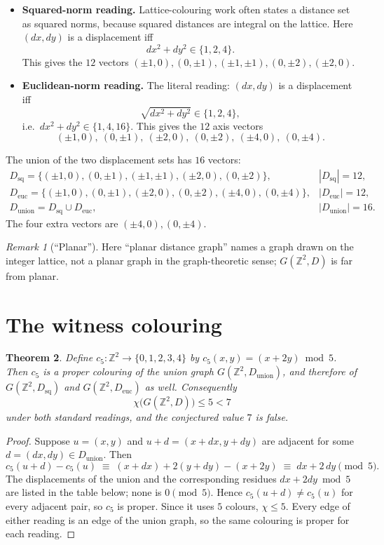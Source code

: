 \documentclass[11pt]{article}
\newtheorem{theorem}{Theorem}
\theoremstyle{definition}
\theoremstyle{remark}
\newtheorem{remark}[theorem]{Remark}
\newcommand{\Z}{\mathbb{Z}}
\newcommand{\chiG}{\chi}
\begin{document}
\begin{itemize}
\item \textbf{Squared-norm reading.} Lattice-colouring work often states a
  distance set as squared norms, because squared distances are integral on the
  lattice. Here $(dx,dy)$ is a displacement iff
  \[
    dx^2 + dy^2 \in \{1,2,4\}.
  \]
  This gives the $12$ vectors $(\pm1,0),(0,\pm1),(\pm1,\pm1),(0,\pm2),(\pm2,0)$.
\item \textbf{Euclidean-norm reading.} The literal reading: $(dx,dy)$ is a
  displacement iff
  \[
    \sqrt{dx^2+dy^2} \in \{1,2,4\},
  \]
  i.e.\ $dx^2+dy^2 \in \{1,4,16\}$. This gives the $12$ axis vectors
  \[
    (\pm1,0),\ (0,\pm1),\ (\pm2,0),\ (0,\pm2),\ (\pm4,0),\ (0,\pm4).
  \]
\end{itemize}

The union of the two displacement sets has $16$ vectors:
\[
\begin{array}{ll}
D_{\mathrm{sq}} = \{(\pm1,0),(0,\pm1),(\pm1,\pm1),(\pm2,0),(0,\pm2)\}, & |D_{\mathrm{sq}}|=12,\\[2pt]
D_{\mathrm{euc}} = \{(\pm1,0),(0,\pm1),(\pm2,0),(0,\pm2),(\pm4,0),(0,\pm4)\}, & |D_{\mathrm{euc}}|=12,\\[2pt]
D_{\mathrm{union}} = D_{\mathrm{sq}} \cup D_{\mathrm{euc}}, & |D_{\mathrm{union}}|=16.
\end{array}
\]
The four extra vectors are $(\pm4,0),(0,\pm4)$.

\begin{remark}[``Planar'']
Here ``planar distance graph'' names a graph drawn on the integer lattice, not a
planar graph in the graph-theoretic sense; $G(\Z^2,D)$ is far from planar.
\end{remark}

\section{The witness colouring}

\begin{theorem}\label{thm:main}
Define $c_5 \colon \Z^2 \to \{0,1,2,3,4\}$ by $c_5(x,y) = (x+2y) \bmod 5$. Then
$c_5$ is a proper colouring of the union graph $G(\Z^2, D_{\mathrm{union}})$, and
therefore of $G(\Z^2, D_{\mathrm{sq}})$ and $G(\Z^2, D_{\mathrm{euc}})$ as well.
Consequently
\[
  \chiG\bigl(G(\Z^2,D)\bigr) \le 5 < 7
\]
under both standard readings, and the conjectured value $7$ is false.
\end{theorem}

\begin{proof}
Suppose $u=(x,y)$ and $u+d = (x+dx, y+dy)$ are adjacent for some
$d=(dx,dy) \in D_{\mathrm{union}}$. Then
\[
  c_5(u+d) - c_5(u) \;\equiv\; (x+dx) + 2(y+dy) - (x+2y)
  \;\equiv\; dx + 2\,dy \pmod 5 .
\]
The displacements of the union and the corresponding residues $dx+2dy \bmod 5$
are listed in the table below; none is $0 \pmod 5$. Hence $c_5(u+d) \neq c_5(u)$
for every adjacent pair, so $c_5$ is proper. Since it uses $5$ colours,
$\chiG \le 5$. Every edge of either reading is an edge of the union graph, so
the same colouring is proper for each reading.
\end{proof}
\end{document}
